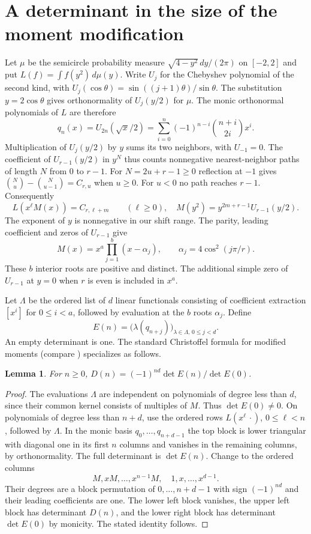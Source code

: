 \documentclass[11pt]{article}
\newtheorem{lemma}[theorem]{Lemma}
\begin{document}
\section{A determinant in the size of the moment modification}
Let $\mu$ be the semicircle probability measure $\sqrt{4-y^2}\,dy/(2\pi)$ on $[-2,2]$ and put $L(f)=\int f(y^2)\,d\mu(y)$. Write $U_j$ for the Chebyshev polynomial of the second kind, with $U_j(\cos\theta)=\sin((j+1)\theta)/\sin\theta$. The substitution $y=2\cos\theta$ gives orthonormality of $U_j(y/2)$ for $\mu$. The monic orthonormal polynomials of $L$ are therefore
\[
 q_n(x)=U_{2n}(\sqrt{x}/2)
       =\sum_{i=0}^n(-1)^{n-i}\binom{n+i}{2i}x^i.
\]
Multiplication of $U_j(y/2)$ by $y$ sums its two neighbors, with $U_{-1}=0$. The coefficient of $U_{r-1}(y/2)$ in $y^N$ thus counts nonnegative nearest-neighbor paths of length $N$ from $0$ to $r-1$. For $N=2u+r-1\ge0$ reflection at $-1$ gives $\binom N u-\binom N{u-1}=C_{r,u}$ when $u\ge0$. For $u<0$ no path reaches $r-1$. Consequently
\[
 L(x^\ell M(x))=C_{r,\ell+m}\qquad(\ell\ge0),
 \quad M(y^2)=y^{2m+r-1}U_{r-1}(y/2).
\]
The exponent of $y$ is nonnegative in our shift range. The parity, leading coefficient and zeros of $U_{r-1}$ give
\[
 M(x)=x^a\prod_{j=1}^b(x-\alpha_j),\qquad
 \alpha_j=4\cos^2(j\pi/r).
\]
These $b$ interior roots are positive and distinct. The additional simple zero of $U_{r-1}$ at $y=0$ when $r$ is even is included in $x^a$.

Let $\Lambda$ be the ordered list of $d$ linear functionals consisting of coefficient extraction $[x^i]$ for $0\le i<a$, followed by evaluation at the $b$ roots $\alpha_j$. Define
\[
 E(n)=\big(\lambda(q_{n+j})\big)_{\lambda\in\Lambda,\,0\le j<d}.
\]
An empty determinant is one. The standard Christoffel formula for modified moments (compare \cite{kratt}) specializes as follows.
\begin{lemma}\label{chris}
For $n\ge0$, \(D(n)=(-1)^{nd}\det E(n)/\det E(0)\).
\end{lemma}
\begin{proof}
The evaluations $\Lambda$ are independent on polynomials of degree less than $d$, since their common kernel consists of multiples of $M$. Thus $\det E(0)\ne0$. On polynomials of degree less than $n+d$, use the ordered rows $L(x^\ell\,\cdot)$, $0\le\ell<n$, followed by $\Lambda$. In the monic basis $q_0,\ldots,q_{n+d-1}$ the top block is lower triangular with diagonal one in its first $n$ columns and vanishes in the remaining columns, by orthonormality. The full determinant is $\det E(n)$. Change to the ordered columns
\[
 M,xM,\ldots,x^{n-1}M,\quad 1,x,\ldots,x^{d-1}.
\]
Their degrees are a block permutation of $0,\ldots,n+d-1$ with sign $(-1)^{nd}$ and their leading coefficients are one. The lower left block vanishes, the upper left block has determinant $D(n)$, and the lower right block has determinant $\det E(0)$ by monicity. The stated identity follows.
\end{proof}
\end{document}
